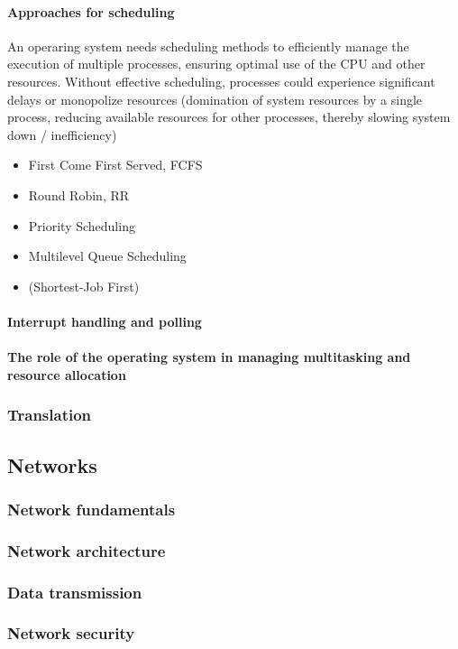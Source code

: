 \paragraph{Approaches for scheduling}
An operaring system needs scheduling methods to efficiently manage the execution of multiple processes, ensuring optimal use of the CPU and other resources. Without effective scheduling, processes could experience significant delays or monopolize resources (domination of system resources by a single process, reducing available resources for other processes, thereby slowing system down / inefficiency)
\begin{itemize}
    \item First Come First Served, FCFS
    \item Round Robin, RR
    \item Priority Scheduling
    \item Multilevel Queue Scheduling
    \item (Shortest-Job First)
\end{itemize}
\paragraph{Interrupt handling and polling}
\paragraph{The role of the operating system in managing multitasking and resource allocation}
\subsubsection{Translation}
\subsection{Networks}
\subsubsection{Network fundamentals}
\subsubsection{Network architecture}
\subsubsection{Data transmission}
\subsubsection{Network security}
